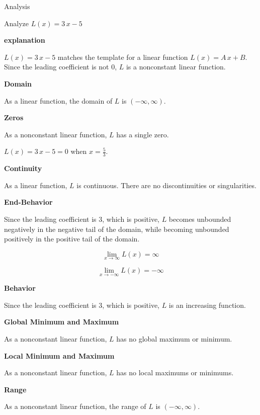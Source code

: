 \documentclass{ximera}
\begin{document}
\begin{example} Analysis

Analyze $L(x) = 3 \, x - 5$  


\textbf{\textcolor{red!75!green}{explanation}} 

$L(x) = 3 \, x - 5$ matches the template for a linear function $L(x) = A \, x + B$.\\
Since the leading coefficient is not $0$, $L$ is a nonconstant linear function.



\textbf{Domain} 

As a linear function, the domain of $L$ is $(-\infty, \infty)$.


\textbf{Zeros} 

As a nonconstant linear function, $L$ has a single zero.

$L(x) = 3 \, x - 5 = 0$ when $x = \frac{5}{3}$. 


\textbf{Continuity} 

As a linear function, $L$ is continuous.  There are no discontinuities or singularities. 



\textbf{End-Behavior} 

Since the leading coefficient is $3$, which is positive, $L$ becomes unbounded negatively in the negative tail of the domain, while becoming unbounded positively in the positive tail of the domain.


\[
\lim\limits_{x \to \infty} L(x) = \infty
\]

\[
\lim\limits_{x \to -\infty} L(x) = -\infty
\]


\textbf{Behavior} 

Since the leading coefficient is $3$, which is positive, $L$ is an increasing function. 



\textbf{Global Minimum and Maximum} 

As a nonconstant linear function, $L$ has no global maximum or minimum. 



\textbf{Local Minimum and Maximum} 

As a nonconstant linear function, $L$ has no local maximums or minimums. 



\textbf{Range} 

As a nonconstant linear function, the range of $L$ is $(-\infty, \infty)$. 



\end{example}
\end{document}
